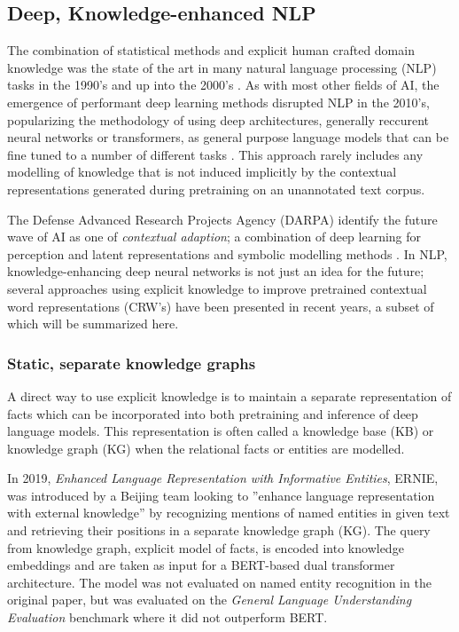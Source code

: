 \documentclass[main.tex]{subfiles}
\begin{document}
\subsection{Deep, Knowledge-enhanced NLP}
The combination of statistical methods and explicit human crafted domain knowledge was the state of the art in many natural language processing (NLP) tasks in the 1990's and up into the 2000's \cite[Sec. 22.5]{russell2016ai}.
As with most other fields of AI, the emergence of performant deep learning methods disrupted NLP in the 2010's, popularizing the methodology of using deep architectures, generally reccurent neural networks or transformers, as general purpose language models that can be fine tuned to a number of different tasks \cite{otter18dlnlp}.
This approach rarely includes any modelling of knowledge that is not induced implicitly by the contextual representations generated during pretraining on an unannotated text corpus.

The Defense Advanced Research Projects Agency (DARPA) identify the future wave of AI as one of \emph{contextual adaption}; a combination of deep learning for perception and latent representations and symbolic modelling methods \cite{darpa17ai}.
In NLP, knowledge-enhancing deep neural networks is not just an idea for the future; several approaches using explicit knowledge to improve pretrained contextual word representations (CRW's) have been presented in recent years, a subset of which will be summarized here.

\subsubsection{Static, separate knowledge graphs}
A direct way to use explicit knowledge is to maintain a separate representation of facts which can be incorporated into both pretraining and inference of deep language models.
This representation is often called a knowledge base (KB) or knowledge graph (KG) when the relational facts or entities are modelled.

In 2019, \emph{Enhanced Language Representation with Informative Entities}, ERNIE, was introduced by a Beijing team \cite{zhang2019ernie} looking to ''enhance language representation  with  external  knowledge'' \cite[1]{zhang2019ernie} by recognizing mentions of named entities in given text and retrieving their positions in a separate knowledge graph (KG).
The query from knowledge graph, explicit model of facts, is encoded into knowledge embeddings and are taken as input for a BERT-based dual transformer architecture.
The model was not evaluated on named entity recognition in the original paper, but was evaluated on the \emph{General Language Understanding Evaluation} benchmark \cite{wang2018glue} where it did not outperform BERT.
\end{document}
